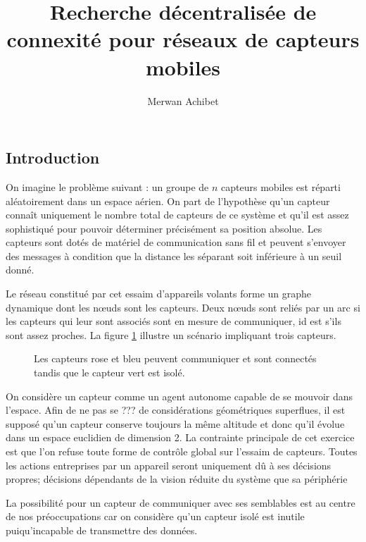 \documentclass[10pt]{article}
\title{Recherche décentralisée de connexité pour réseaux de capteurs mobiles}
\author{Merwan Achibet}
\date{}
\begin{document}
\maketitle

\begin{multicols}{2}

\section{Introduction}

On imagine le problème suivant : un groupe de $n$ capteurs mobiles est
réparti aléatoirement dans un espace aérien. On part de l'hypothèse
qu'un capteur connaît uniquement le nombre total de capteurs de ce
système et qu'il est assez sophistiqué pour pouvoir déterminer
précisément sa position absolue. Les capteurs sont dotés de matériel
de communication sans fil et peuvent s'envoyer des messages à
condition que la distance les séparant soit inférieure à un seuil
donné.

Le réseau constitué par cet essaim d'appareils volants forme un graphe
dynamique dont les n\oe uds sont les capteurs. Deux n\oe uds sont
reliés par un arc si les capteurs qui leur sont associés sont en
mesure de communiquer, id est s'ils sont assez proches. La figure
\ref{communication} illustre un scénario impliquant trois capteurs.

\begin{figure}[H]

  \centering

  

  \caption{Les capteurs rose et bleu peuvent communiquer et sont
    connectés tandis que le capteur vert est isolé.}
  \label{communication}

\end{figure}

On considère un capteur comme un agent autonome capable de se mouvoir
dans l'espace. Afin de ne pas se ??? de considérations géométriques
superflues, il est supposé qu'un capteur conserve toujours la même
altitude et donc qu'il évolue dans un espace euclidien de dimension
2. La contrainte principale de cet exercice est que l'on refuse toute
forme de contrôle global sur l'essaim de capteurs. Toutes les actions
entreprises par un appareil seront uniquement dû à ses décisions
propres; décisions dépendants de la vision réduite du système que sa
périphérie

La possibilité pour un capteur de communiquer avec ses semblables est
au centre de nos préoccupations car on considère qu'un capteur isolé
est inutile puiqu'incapable de transmettre des données.


\end{multicols}
\end{document}
